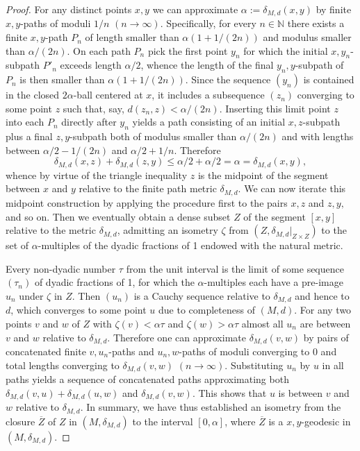 \documentclass[11pt,a4paper]{amsart}
\theoremstyle{definition}
\numberwithin{equation}{section}
\newcommand{\MM}{\ensuremath{M}}
\begin{document}
\begin{proof} For any distinct points $x,y$ we can approximate $\alpha:=\delta_{\MM,d}(x,y)$ by finite
$x,y$-paths of moduli $1/n$  $(n\rightarrow\infty)$. Specifically, for every $n\in \mathbb N$ there exists a finite $x,y$-path $P_n$ of length smaller
than $\alpha(1 + 1/(2n))$ and modulus smaller than $\alpha/(2n)$. On each path $P_n$ pick the first point $y_n$ for which the initial
$x,y_n$-subpath $P'_{n}$ exceeds length $\alpha/2$, whence the length of the final $y_n,y$-subpath of $P_n$ is then smaller than
$\alpha(1 + 1/(2n)).$ Since the sequence $(y_n)$ is contained in the closed $2\alpha$-ball centered at $x$, it includes a
subsequence $(z_n)$ converging to some point $z$ such that, say, $d(z_n,z)<\alpha/(2n)$. Inserting this limit point $z$ into each $P_n$
directly after $y_n$ yields a path consisting of an initial $x,z$-subpath plus a final $z,y$-subpath both of modulus smaller than $\alpha/(2n)$
and with lengths between  $\alpha/2-1/(2n)$ and $\alpha/2+1/n.$ Therefore
$$\delta_{\MM,d}(x,z)+\delta_{\MM,d}(z,y)\le \alpha/2+ \alpha/2=\alpha=\delta_{\MM,d}(x,y),$$
whence by virtue of the triangle inequality $z$ is the midpoint of the segment between $x$ and $y$ relative to the finite path metric $\delta_{\MM,d}$.
We can now iterate this midpoint construction by applying the procedure first to the pairs $x,z$ and $z,y,$ and so on. Then we eventually obtain a
dense subset $Z$ of the segment $[x,y]$ relative to the metric $\delta_{\MM,d}$, admitting an isometry $\zeta$ from $(Z,\delta_{\MM,d}|_{Z\times Z})$
to the set of $\alpha$-multiples of the dyadic fractions of 1 endowed with the natural metric.

Every non-dyadic number $\tau$ from the unit interval is the limit of some sequence $(\tau_n)$ of dyadic fractions of 1, for which the $\alpha$-multiples
each have a pre-image $u_n$ under $\zeta$ in $Z$. Then $(u_n)$ is a Cauchy sequence relative to $\delta_{\MM,d}$ and hence to $d$, which converges to some
point $u$ due to completeness of $(\MM,d)$. For any two points $v$ and $w$ of $Z$ with $\zeta(v)<\alpha\tau$ and $\zeta(w)>\alpha\tau$ almost all $u_n$
are between $v$ and $w$ relative to $\delta_{\MM,d}$. Therefore one can approximate $\delta_{\MM,d}(v,w)$ by pairs of concatenated finite $v,u_n$-paths
and $u_n,w$-paths of moduli converging to 0 and total lengths converging to $\delta_{\MM,d}(v,w)$ $(n\rightarrow\infty)$. Substituting $u_n$ by $u$ in
all paths yields a sequence of concatenated paths approximating both $\delta_{\MM,d}(v,u) +\delta_{\MM,d}(u,w)$ and $\delta_{\MM,d}(v,w)$. This shows
that $u$ is between $v$ and $w$ relative to $\delta_{\MM,d}$. In summary, we have thus established an isometry from the closure $\overline{Z}$ of
$Z$ in $(\MM,\delta_{\MM,d})$ to the interval $[0,\alpha]$, where $\overline{Z}$ is a $x,y$-geodesic in $(\MM,\delta_{\MM,d}).$
\end{proof}
\end{document}
